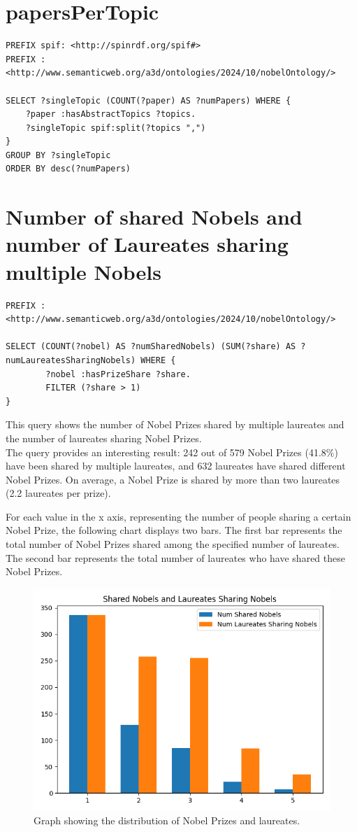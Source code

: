 \documentclass{article}
\begin{document}
\section{papersPerTopic}

\begin{lstlisting}
PREFIX spif: <http://spinrdf.org/spif#>
PREFIX : <http://www.semanticweb.org/a3d/ontologies/2024/10/nobelOntology/>

SELECT ?singleTopic (COUNT(?paper) AS ?numPapers) WHERE {
    ?paper :hasAbstractTopics ?topics.
    ?singleTopic spif:split(?topics ",")
}
GROUP BY ?singleTopic
ORDER BY desc(?numPapers)
\end{lstlisting}

\section{Number of shared Nobels and number of Laureates sharing multiple Nobels}

\begin{lstlisting}
PREFIX : <http://www.semanticweb.org/a3d/ontologies/2024/10/nobelOntology/>

SELECT (COUNT(?nobel) AS ?numSharedNobels) (SUM(?share) AS ?numLaureatesSharingNobels) WHERE {
        ?nobel :hasPrizeShare ?share.
        FILTER (?share > 1)
}
\end{lstlisting}

This query shows the number of Nobel Prizes shared by multiple laureates
and the number of laureates sharing Nobel Prizes.\\
The query provides an interesting result: 242 out of 579 Nobel Prizes (41.8\%) have
been shared by multiple laureates, and 632 laureates have shared different Nobel Prizes.
On average, a Nobel Prize is shared by more than two laureates (2.2 laureates per prize).

\noindent For each value in the x axis, representing the number of people sharing a certain Nobel Prize, the following chart displays two bars.
The first bar represents the total number of Nobel Prizes shared among the specified number of laureates.
The second bar represents the total number of laureates who have shared these Nobel Prizes.
\begin{figure}[H]
	\centering
	\includegraphics[width=0.7\linewidth]{../queries/plots/prizeShare.png}
	\caption{Graph showing the distribution of Nobel Prizes and laureates.}
	\label{fig:prizeShare}
\end{figure}
\end{document}
